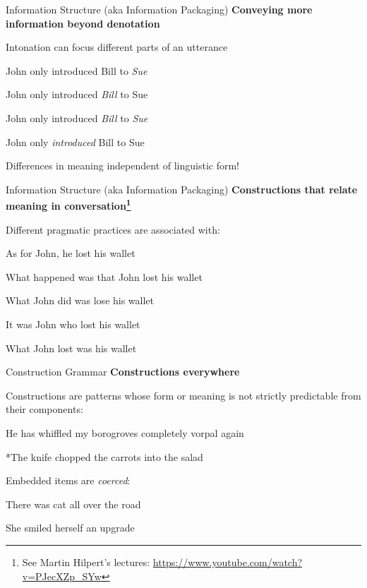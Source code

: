 \documentclass[aspectratio=169,cramped]{beamer}
\let\tempone\itemize
\let\temptwo\enditemize
\renewenvironment{itemize}{\tempone\addtolength{\itemsep}{-0\baselineskip}\addtolength{\parskip}{-0.2\baselineskip}}{\temptwo}
\newcommand{\ex}[1]{{\color{teal} #1}}
\begin{document}
\begin{frame}{Information Structure (aka Information Packaging)}
	\textbf{Conveying more information beyond denotation}
  \begin{itemize}
  \item Intonation can focus different parts of an utterance
    \begin{itemize}
    \item \ex{John only introduced Bill to \emph{Sue}}
    \item \ex{John only introduced \emph{Bill} to Sue}
    \item \ex{John only introduced \emph{Bill} to \emph{Sue}}
    \item \ex{John only \emph{introduced} Bill to Sue}
    \end{itemize}
  \item Differences in meaning independent of linguistic form!
  \end{itemize}
\end{frame}

\begin{frame}{Information Structure (aka Information Packaging)}
	\textbf{Constructions that relate meaning in conversation\footnote{See Martin Hilpert's lectures:
    \protect\url{https://www.youtube.com/watch?v=PJecXZp_SYw}}}
\begin{itemize}
  \item Different pragmatic practices are associated with:
    \begin{itemize}
    \item \ex{As for John, he lost his wallet}
    \item \ex{What happened was that John lost his wallet}
    \item \ex{What John did was lose his wallet}
    \item \ex{It was John who lost his wallet}
    \item \ex{What John lost was his wallet}
    \end{itemize}
  \end{itemize}
\end{frame}

\begin{frame}{Construction Grammar}
	\textbf{Constructions everywhere}
  \begin{itemize}
  \item Constructions are patterns whose form or meaning is not strictly predictable from their
    components:
    \begin{itemize}
    \item \ex{He has whiffled my borogroves completely vorpal again}
    \item \ex{*The knife chopped the carrots into the salad}
    \end{itemize}
  \item Embedded items are \emph{coerced}:
    \begin{itemize}
    \item \ex{There was cat all over the road}
    \item \ex{She smiled herself an upgrade}
    \end{itemize}
  \end{itemize}
\end{frame}
\end{document}
